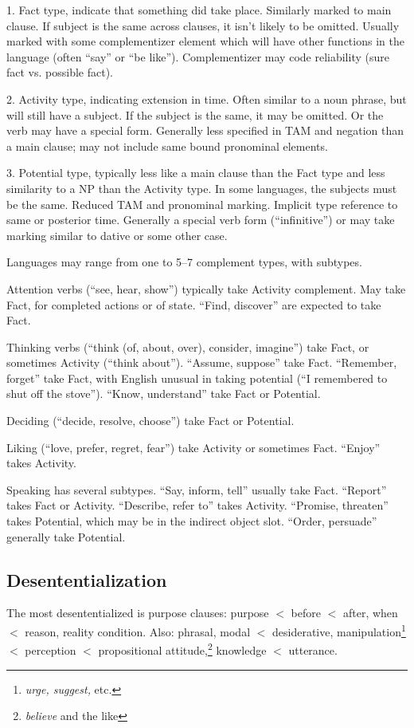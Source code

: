 \documentclass[11pt]{article}
\begin{document}
1.  Fact type, indicate that something did take place.  Similarly
marked to main clause.  If subject is the same across clauses, it
isn't likely to be omitted.  Usually marked with some complementizer
element which will have other functions in the language (often ``say''
or ``be like'').  Complementizer may code reliability (sure fact
vs. possible fact).

2. Activity type, indicating extension in time.  Often similar to a
noun phrase, but will still have a subject.  If the subject is the
same, it may be omitted.  Or the verb may have a special form.
Generally less specified in TAM and negation than a main clause; may
not include same bound pronominal elements.

3. Potential type, typically less like a main clause than the Fact
type and less similarity to a NP than the Activity type.  In some
languages, the subjects must be the same.  Reduced TAM and pronominal
marking.  Implicit type reference to same or posterior time.
Generally a special verb form (``infinitive'') or may take marking
similar to dative or some other case.

Languages may range from one to 5--7 complement types, with subtypes.

Attention verbs (``see, hear, show'') typically take Activity
complement.  May take Fact, for completed actions or of state.
``Find, discover'' are expected to take Fact.

Thinking verbs (``think (of, about, over), consider, imagine'') take
Fact, or sometimes Activity (``think about'').  ``Assume, suppose''
take Fact.  ``Remember, forget'' take Fact, with English unusual in
taking potential (``I remembered to shut off the stove'').  ``Know,
understand'' take Fact or Potential.

Deciding (``decide, resolve, choose'') take Fact or Potential.

Liking (``love, prefer, regret, fear'') take Activity or sometimes
Fact.  ``Enjoy'' takes Activity.

Speaking has several subtypes.  ``Say, inform, tell'' usually take
Fact.  ``Report'' takes Fact or Activity.  ``Describe, refer to''
takes Activity.  ``Promise, threaten'' takes Potential, which may be
in the indirect object slot.  ``Order, persuade'' generally take
Potential. 

\subsection{Desententialization}
The most desententialized is purpose clauses: purpose $<$ before $<$
after, when $<$ reason, reality condition.  Also: phrasal, modal $<$
desiderative, manipulation\footnote{\textit{urge, suggest,} etc.} $<$
perception $<$ propositional attitude,\footnote{\textit{believe} and
the like} knowledge $<$ utterance.
\end{document}

